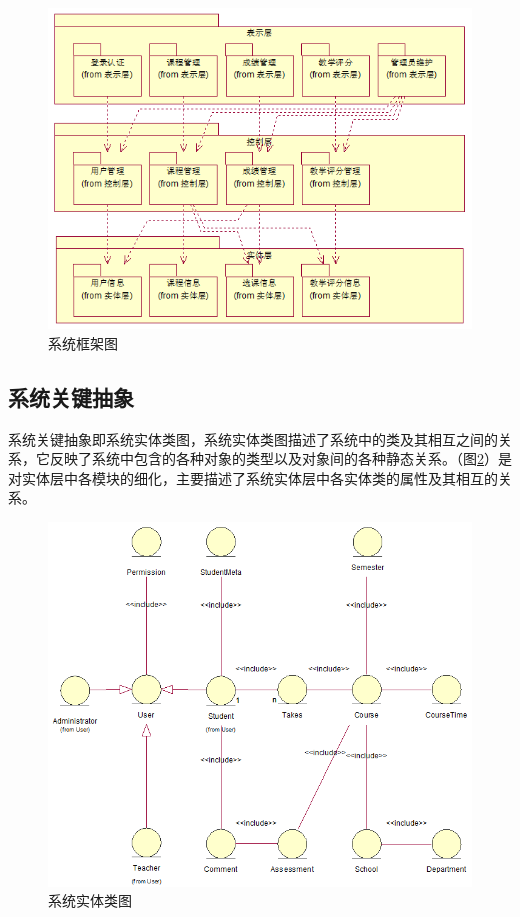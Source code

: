 \begin{figure}[H]
  \centering
  \includegraphics[width=\textwidth]{img/jwxt_system_arch}
  \caption{系统框架图}
  \label{fig:system_arch}
\end{figure}

\subsection{系统关键抽象}\label{sec:system_key_abstract}
系统关键抽象即系统实体类图，系统实体类图描述了系统中的类及其相互之间的关系，它反映了系统中包含的各种对象的类型以及对象间的各种静态关系。（图\ref{fig:system_entity}）是对实体层中各模块的细化，主要描述了系统实体层中各实体类的属性及其相互的关系。

\begin{figure}[htb]
  \centering
  \includegraphics[width=\textwidth]{img/system_entity}
  \caption{系统实体类图}
  \label{fig:system_entity}
\end{figure}
